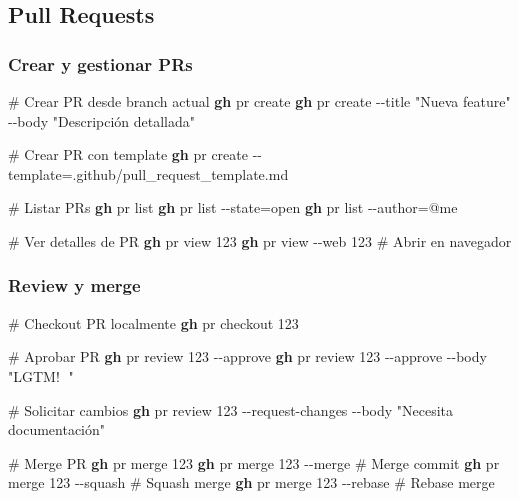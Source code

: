\documentclass[
  11pt,
  letterpaper,
  oneside,
  openany]{scrbook}
\newenvironment{Shaded}{}{}
\newcommand{\AttributeTok}[1]{\textcolor[rgb]{0.84,0.23,0.29}{#1}}
\newcommand{\CommentTok}[1]{\textcolor[rgb]{0.42,0.45,0.49}{#1}}
\newcommand{\ExtensionTok}[1]{\textcolor[rgb]{0.84,0.23,0.29}{\textbf{#1}}}
\newcommand{\NormalTok}[1]{\textcolor[rgb]{0.14,0.16,0.18}{#1}}
\newcommand{\OperatorTok}[1]{\textcolor[rgb]{0.14,0.16,0.18}{#1}}
\newcommand{\StringTok}[1]{\textcolor[rgb]{0.01,0.18,0.38}{#1}}
\begin{document}
\subsection{Pull Requests}\label{pull-requests}

\subsubsection{Crear y gestionar PRs}\label{crear-y-gestionar-prs}

\begin{Shaded}
\begin{Highlighting}[]
\CommentTok{\# Crear PR desde branch actual}
\ExtensionTok{gh}\NormalTok{ pr create}
\ExtensionTok{gh}\NormalTok{ pr create }\AttributeTok{{-}{-}title} \StringTok{"Nueva feature"} \AttributeTok{{-}{-}body} \StringTok{"Descripción detallada"}

\CommentTok{\# Crear PR con template}
\ExtensionTok{gh}\NormalTok{ pr create }\AttributeTok{{-}{-}template}\OperatorTok{=}\NormalTok{.github/pull\_request\_template.md}

\CommentTok{\# Listar PRs}
\ExtensionTok{gh}\NormalTok{ pr list}
\ExtensionTok{gh}\NormalTok{ pr list }\AttributeTok{{-}{-}state}\OperatorTok{=}\NormalTok{open}
\ExtensionTok{gh}\NormalTok{ pr list }\AttributeTok{{-}{-}author}\OperatorTok{=}\NormalTok{@me}

\CommentTok{\# Ver detalles de PR}
\ExtensionTok{gh}\NormalTok{ pr view 123}
\ExtensionTok{gh}\NormalTok{ pr view }\AttributeTok{{-}{-}web}\NormalTok{ 123  }\CommentTok{\# Abrir en navegador}
\end{Highlighting}
\end{Shaded}

\subsubsection{Review y merge}\label{review-y-merge}

\begin{Shaded}
\begin{Highlighting}[]
\CommentTok{\# Checkout PR localmente}
\ExtensionTok{gh}\NormalTok{ pr checkout 123}

\CommentTok{\# Aprobar PR}
\ExtensionTok{gh}\NormalTok{ pr review 123 }\AttributeTok{{-}{-}approve}
\ExtensionTok{gh}\NormalTok{ pr review 123 }\AttributeTok{{-}{-}approve} \AttributeTok{{-}{-}body} \StringTok{"LGTM! 🚀"}

\CommentTok{\# Solicitar cambios}
\ExtensionTok{gh}\NormalTok{ pr review 123 }\AttributeTok{{-}{-}request{-}changes} \AttributeTok{{-}{-}body} \StringTok{"Necesita documentación"}

\CommentTok{\# Merge PR}
\ExtensionTok{gh}\NormalTok{ pr merge 123}
\ExtensionTok{gh}\NormalTok{ pr merge 123 }\AttributeTok{{-}{-}merge}  \CommentTok{\# Merge commit}
\ExtensionTok{gh}\NormalTok{ pr merge 123 }\AttributeTok{{-}{-}squash}  \CommentTok{\# Squash merge}
\ExtensionTok{gh}\NormalTok{ pr merge 123 }\AttributeTok{{-}{-}rebase}  \CommentTok{\# Rebase merge}
\end{Highlighting}
\end{Shaded}
\end{document}
